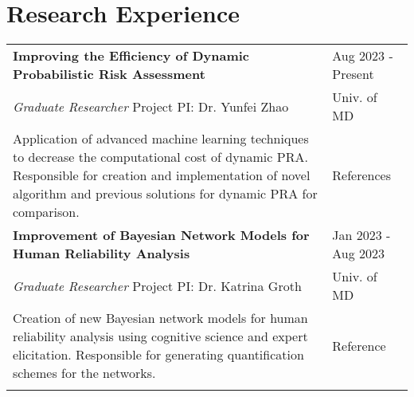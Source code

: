 \documentclass[letterpaper, 11pt]{article}
\begin{document}
\section{Research Experience}
\begin{table}[H]
    \centering
    \begin{tabular}{L{0.7\textwidth} R{0.2\textwidth}}
        \textbf{Improving the Efficiency of Dynamic Probabilistic Risk Assessment} & Aug 2023 - Present \\
        \hspace{5pt} \textit{Graduate Researcher} \hspace{25pt} Project PI: Dr. Yunfei Zhao & Univ. of MD\\
        \hspace{5pt} Application of advanced machine learning techniques to decrease the computational cost of dynamic PRA.
        Responsible for creation and implementation of novel algorithm and previous solutions for dynamic PRA for comparison. & References \cite{Zhao2024RAMS,OLeary2024improving} \\

        \textbf{Improvement of Bayesian Network Models for Human Reliability Analysis} & Jan 2023 - Aug 2023 \\
        \hspace{5pt} \textit{Graduate Researcher} \hspace{25pt} Project PI: Dr. Katrina Groth & Univ. of MD \\
        \hspace{5pt} Creation of new Bayesian network models for human reliability analysis using cognitive science and expert elicitation.
        Responsible for generating quantification schemes for the networks. & Reference \cite{OLeary2023survey} \\
        \hspace{5pt}
    \end{tabular}
\end{table}
\end{document}

